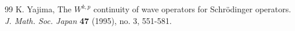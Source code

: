 \documentclass[11pt,reqno]{amsart}
\numberwithin{equation}{section}
\theoremstyle{definition}
\begin{document}
\begin{thebibliography}{99}
 K. Yajima, The $W^{k,p}$ continuity of wave operators for Schr\"{o}dinger operators. \textit{J. Math. Soc. Japan} \textbf{47} (1995), no. 3, 551-581.



\end{thebibliography}

\end{document}
